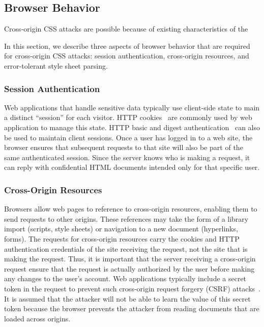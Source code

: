 \documentclass{acm_proc_article-sp}
\begin{document}
\subsection{Browser Behavior}

Cross-origin CSS attacks are possible because of existing
characteristics of the 

In this section, we describe three aspects of browser behavior that are required for cross-origin CSS attacks: session authentication, cross-origin resources, and error-tolerant style sheet parsing.

\subsubsection{Session Authentication}
Web applications that handle sensitive data typically use client-side state to
main a distinct ``session'' for each visitor. HTTP cookies~\cite{rfc2109,
httpstate} are commonly used by web application to manage this state. HTTP
basic and digest authentication~\cite{rfc2617} can also be used to maintain
client sessions. Once a user has logged in to a web site, the browser ensures
that subsequent requests to that site will also be part of the same
authenticated session. Since the server knows who is making a request, it can
reply with confidential HTML documents intended only for that specific user.

\subsubsection{Cross-Origin Resources}
Browsers allow web pages to reference to cross-origin resources, enabling them to send requests to other origins. These references may take the form of a library import (scripts, style sheets) or navigation to a new document (hyperlinks, forms). The requests for cross-origin resources carry the cookies and HTTP authentication credentials of the site receiving the request, not the site that is making the request. Thus, it is important that the server receiving a cross-origin request ensure that the request is actually authorized by the user before making any changes to the user's account. Web applications typically include a secret token in the request to prevent such cross-origin request forgery (CSRF) attacks~\cite{csrf}. It is assumed that the attacker will not be able to learn the value of this secret token because the browser prevents the attacker from reading documents that are loaded across origins.

\end{document}
